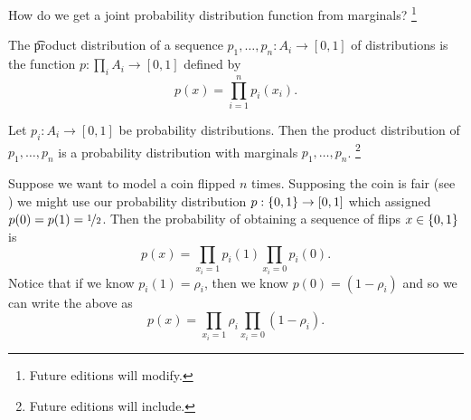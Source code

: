 

How do we get a joint probability distribution function from marginals?
  \ifhmode\unskip\fi\footnote{
Future editions will modify.
  }


The \t{product distribution} of a sequence $p_1, \dots , p_n: A_i \to [0, 1]$ of distributions is the function $p: \prod_{i} A_i \to [0, 1]$ defined by
  \[
p(x) = \prod_{i = 1}^{n} p_i(x_i).
  \]

\begin{proposition}
Let $p_i: A_i \to [0, 1]$ be probability distributions.
Then the product distribution of $p_1, \dots , p_n$ is a probability distribution with marginals $p_1, \dots , p_n$.
  \ifhmode\unskip\fi\footnote{
Future editions will include.
  }
\end{proposition}


Suppose we want to model a coin flipped $n$ times.
Supposing the coin is fair (see ) we might use our probability distribution $p: \{0, 1\} \to [0, 1]$ which assigned $p(0) = p(1) = \nicefrac{1}{2}$.
Then the probability of obtaining a sequence of flips $x \in \{0, 1\}$ is
  \[
\textstyle
p(x) = \prod_{x_i = 1} p_i(1) \prod_{x_i = 0} p_i(0).
  \]
Notice that if we know $p_i(1) = \rho _i$, then we know $p(0) = (1-\rho _i)$ and so we can write the above as
  \[
\textstyle
p(x) = \prod_{x_i = 1} \rho _i \prod_{x_i = 0} (1-\rho _i).
  \]
